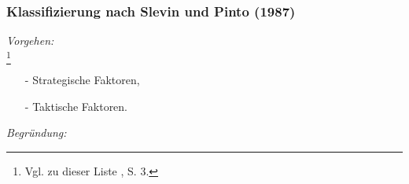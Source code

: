 \noindent
\subsubsection{Klassifizierung nach Slevin und Pinto (1987)}
\textit{Vorgehen:}\\\noindent
\footnote{Vgl. zu dieser Liste \cite{Slevin.1987}, S. 3.}
\begin{itemize}\itemsep0pt
\item[-]Strategische Faktoren,
\item[-]Taktische Faktoren.
\end{itemize}
\textit{Begründung:}\\\noindent
